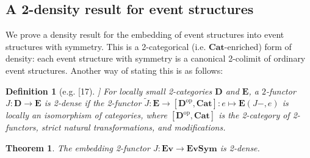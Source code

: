 \documentclass[10pt,a4paper]{amsart}
\newtheorem*{definition}{Definition}
\newtheorem*{theorem}{Theorem}
\newcommand{\ES}{\mathbf{Ev}}
\newcommand{\SES}{\mathbf{EvSym}}
\newcommand{\Cat}{\mathbf{Cat}}
\begin{document}
\subsection{A 2-density result for event structures}
\label{subsec:2density}

\newcommand{\bE}{\mathbf{E}}
\newcommand{\bC}{\mathbf{C}}
\newcommand{\bD}{\mathbf{D}}

We prove a density result for the embedding of event structures into event structures with symmetry. This is a 2-categorical (i.e. $\Cat$-enriched) form of density: each event structure with symmetry is a canonical 2-colimit of  ordinary event structures. Another way of stating this is as follows:

\newcommand{\op}{\mathrm{op}}

\begin{definition}[e.g. [17]]
For locally small 2-categories $\bD$ and $\bE$, a $2$-functor $J : \bD \rightarrow \bE$ is \emph{2-dense} if the 2-functor $\tilde{J} : \bE \to [\bD^\op, \Cat] : e \mapsto \bE(J-, e)$ is locally an isomorphism of categories, where $[\bD^\op, \Cat]$ is the 2-category of 2-functors, strict natural transformations, and modifications. 
\end{definition}

\begin{theorem}
The embedding 2-functor $J : \ES \to \SES$ is 2-dense.
\end{theorem}
\end{document}
